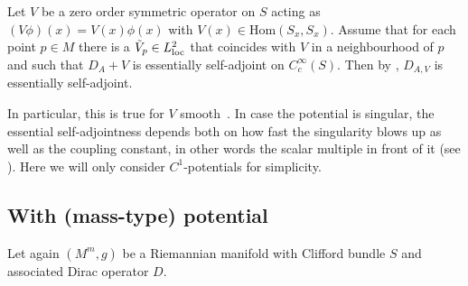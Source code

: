 \documentclass[pdftex]{sigma}
\numberwithin{equation}{section}
\begin{document}
\begin{Remark}\label{rem:ess_sa} Let $V$ be a zero order symmetric operator on $S$ acting as $(V\phi)(x)=V(x)\phi(x)$ with $V(x)\in \mathrm{Hom} (S_x,S_x)$. Assume that for each point $p\in M$ there is a $\tilde{V}_p\in L^2_{\rm{loc}}$ that coincides with $V$ in a neighbourhood of $p$ and such that $D_A+V$ is essentially self-adjoint on $C_c^\infty(S)$. Then by \cite[Theorem~2.1]{Chernoff2}, $D_{A,V}$ is essentially self-adjoint.

In particular, this is true for $V$ smooth~\cite[Theorem~2.2]{Chernoff}.
In case the potential is singular, the essential self-adjointness depends both on how fast the singularity blows up as well as the coupling constant, in other words the scalar multiple in front of it (see \cite[Section~4.3.3]{Thaller}). Here we will only consider $C^1$-potentials for simplicity.
\end{Remark}

\subsection{With (mass-type) potential}\label{sec:potential}
Let again $(M^m,g)$ be a Riemannian manifold with Clifford bundle $S$ and associated Dirac operator $D$.
\end{document}
